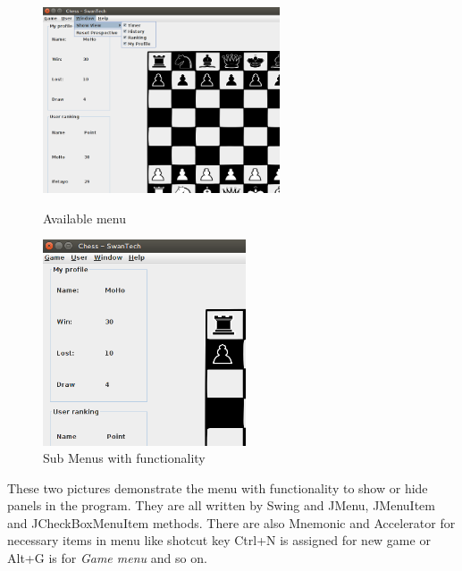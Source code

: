 \documentclass[a4paper,10pt]{article}
\begin{document}
\begin{figure}[!htb]
  \includegraphics[width=7cm]{Menu.png}
  \caption{Available menu  \label{fig:menu1}}
\endminipage\hfill
{}
  \includegraphics[width=6cm]{Menu2.png}
  \caption{Sub Menus with functionality  \label{fig:menu2}}
\endminipage\hfill
\end{figure}
These two pictures demonstrate the menu with functionality to show or hide panels in the program. They are all written by Swing and JMenu, JMenuItem and JCheckBoxMenuItem methods. There are also Mnemonic and Accelerator for necessary items in menu like shotcut key Ctrl+N is assigned for new game or Alt+G is for \textit{Game menu} and so on. 
\end{document}
